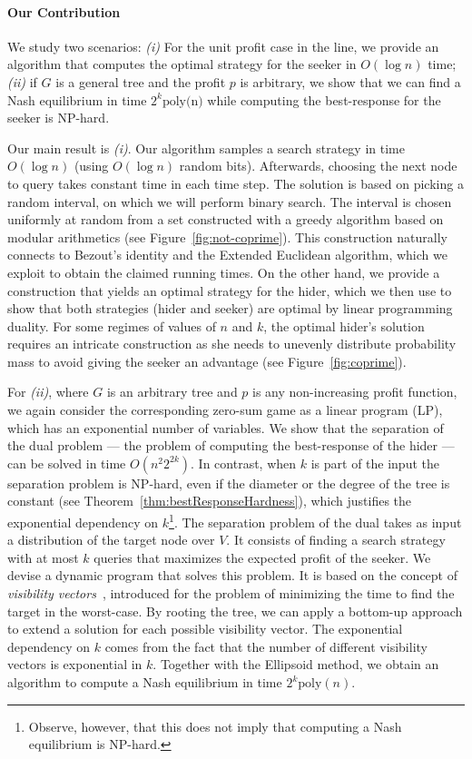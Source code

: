 \documentclass[11pt]{article}
\newcommand\+{\mkern2mu}
\begin{document}
\paragraph*{Our Contribution}

We study two scenarios: \emph{(i)} For the unit profit case in the line, we provide an algorithm that computes the optimal strategy for the seeker in $O(\log n)$ time; \emph{(ii)} if $G$ is a general tree and the profit $p$ is arbitrary, we show that we can find a Nash equilibrium in time $2^k\text{poly(n)}$ while computing the best-response for the seeker is NP-hard. 

Our main result is \emph{(i)}. Our algorithm samples a search strategy in time $O(\log n)$ (using $O(\log n)$ random bits). Afterwards, choosing the next node to query takes constant time in each time step. The solution is based on picking a random interval, on which we will perform binary search. The interval is chosen uniformly at random from a set constructed with a greedy algorithm based on modular arithmetics (see Figure~\ref{fig:not-coprime}). This construction naturally connects to Bezout's identity and the Extended Euclidean algorithm, which we exploit to obtain the claimed running times. 
On the other hand, we provide a construction that yields an optimal strategy for the hider, which we then use to show that both strategies (hider and seeker) are optimal by linear programming duality. For some regimes of values of $n$ and $k$, the optimal hider's solution requires an intricate construction as she needs to unevenly distribute probability mass to avoid giving the seeker an advantage (see Figure~\ref{fig:coprime}).    

For \emph{(ii)}, where $G$ is an arbitrary tree and $p$ is any non-increasing profit function, we again consider the corresponding zero-sum game as a linear program (LP), which has an exponential number of variables. We show that the separation of the dual problem --- the problem of computing the best-response of the hider --- can be solved in time $O(n^2 2^{2k})$. In contrast, when $k$ is part of the input the separation problem is NP-hard, even if the diameter or the degree of the tree is constant (see Theorem~\ref{thm:bestResponseHardness}), which justifies the exponential dependency on $k$\footnote{Observe, however, that this does not imply that computing a Nash equilibrium is NP-hard.}. The separation problem of the dual takes as input a distribution of the target node over $V$. It consists of finding a search strategy with at most $k$ queries that maximizes the expected profit of the seeker. We devise a dynamic program that solves this problem. It is based on the concept of \emph{visibility vectors}~\cite{onak2006generalization,lam_optimal_2001, dereniowski2008edge}, introduced for the problem of minimizing the time to find the target in the worst-case. By rooting the tree, we can apply a bottom-up approach to extend a solution for each possible visibility vector. The exponential dependency on $k$ comes from the fact that the number of different visibility vectors is exponential in $k$. Together with the Ellipsoid method, we obtain an algorithm to compute a Nash equilibrium in time $2^k\text{poly}(n)$. 
\end{document}
